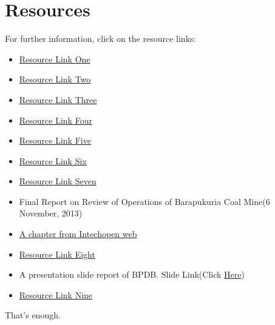\documentclass[11 pt]{article}
\begin{document}
\section{Resources}
For further information, click on the resource links:
\vspace{2 mm}
\newenvironment{myitemizetwo}
{\begin{itemize}}{\end{itemize}}
\begin{myitemizetwo}
	\item \href{https://realpars.com/power-plant/}{Resource Link One}
	\item \href{http://globalenergyobservatory.org/geoid/40466}{Resource Link Two}
	\item \href{https://www.thedailystar.net/news/country/barapukuria-power-plant-shut-down-again-1625698}{Resource Link Three}
	\item \href{https://www.thedailystar.net/backpage/disappearance-coal-barapukuria-plant-faces-shutdown-1609210}{Resource Link Four}
	\item \href{http://www.dhakatribune.com/bangladesh/development/2017/12/03/national-grid-barapukuria-power/}{Resource Link Five}
	\item \href{https://elearn.daffodilvarsity.edu.bd/course/view.php?id=5625}{Resource Link Six}
	\item \href{https://www.quora.com/What-is-the-importance-of-a-thermal-power-plant}{Resource Link Seven}
	\item Final Report on Review of Operations of Barapukuria Coal Mine(6 November, 2013)
	\item \href{https://www.intechopen.com/books/thermal-power-plants/an-overview-of-financial-aspect-for-thermal-power-plants}{A chapter from Intechopen web}
	\item \href{https://china.aiddata.org/projects/34237}{Resource Link Eight}
	\item A presentation slide report of BPDB. Slide Link(Click \href{https://usea.org/sites/default/files/event-file/493/overviewofbpdb.pdf}{Here})
	\item \href{https://www.mechanicaltutorial.com/thermal-power-plant-operation#thermal-power-plant-operation}{Resource Link Nine}
\end{myitemizetwo}
\vspace{2 mm}
That's enough.

{
	\raggedleft\vfill\itshape\Longstack[r]
		{
			\textcolor{LightSkyBlue4}{Thank You,}\\
			\textcolor{LightSkyBlue4}{Md. Momin Biswas}\\
			\textcolor{LightSkyBlue4}{Dept. of EEE, BSMRSTU}
		}\par
}

\pagebreak

\printindex
\end{document}
